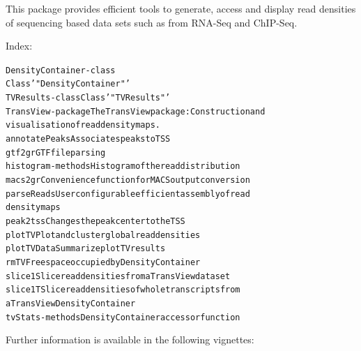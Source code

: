 \documentclass[letterpaper]{book}
\begin{document}
%
\begin{Description}
This package provides efficient tools to generate, access and display 
read densities of sequencing based data sets such as from RNA-Seq and ChIP-Seq.  
\end{Description}
%
\begin{Details}


Index:
\begin{alltt}
DensityContainer-class
                        Class '"DensityContainer"'
TVResults-class         Class '"TVResults"'
TransView-package       The TransView package: Construction and
                        visualisation of read density maps.
annotatePeaks           Associates peaks to TSS
gtf2gr                  GTF file parsing
histogram-methods       Histogram of the read distribution
macs2gr                 Convenience function for MACS output conversion
parseReads              User configurable efficient assembly of read
                        density maps
peak2tss                Changes the peak center to the TSS
plotTV                  Plot and cluster global read densities
plotTVData              Summarize plotTV results
rmTV                    Free space occupied by DensityContainer
slice1                  Slice read densities from a TransView dataset
slice1T                 Slice read densities of whole transcripts from
                        a TransView DensityContainer
tvStats-methods         DensityContainer accessor function
\end{alltt}


Further information is available in the following vignettes:

\end{Details}
\end{document}
